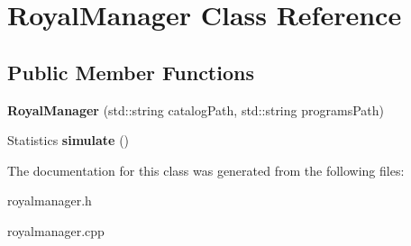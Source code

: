 \hypertarget{class_royal_manager}{}\section{Royal\+Manager Class Reference}
\label{class_royal_manager}
\subsection*{Public Member Functions}
\begin{DoxyCompactItemize}
\item 
{\bfseries Royal\+Manager} (std\+::string catalog\+Path, std\+::string programs\+Path)\hypertarget{class_royal_manager_a4b79671055cc14a68f152defd01724d6}{}\label{class_royal_manager_a4b79671055cc14a68f152defd01724d6}

\item 
Statistics {\bfseries simulate} ()\hypertarget{class_royal_manager_aa114619506c53268470cec99ae3e4280}{}\label{class_royal_manager_aa114619506c53268470cec99ae3e4280}

\end{DoxyCompactItemize}


The documentation for this class was generated from the following files\+:\begin{DoxyCompactItemize}
\item 
royalmanager.\+h\item 
royalmanager.\+cpp\end{DoxyCompactItemize}
